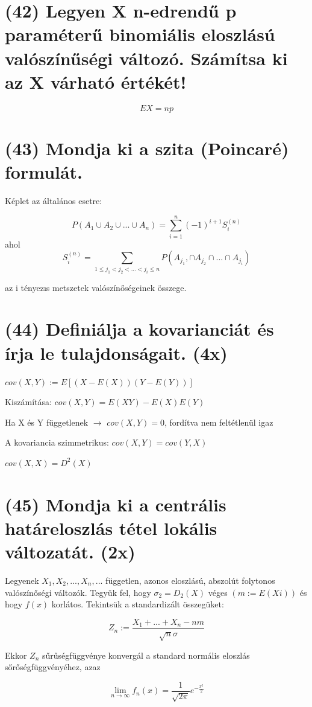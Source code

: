 \documentclass[12p]{article}
\begin{document}
\section{(42) Legyen X n-edrendű p paraméterű binomiális eloszlású valószínűségi változó. Számítsa ki az X várható értékét!}

$$EX = np$$

\section{(43) Mondja ki a szita (Poincaré) formulát.}

Képlet az általános esetre:

$$P(A_1 \cup A_2 \cup ... \cup A_n) = \sum^n_{i=1} (-1)^{i+1} S^{(n)}_i$$
ahol
$$S^{(n)}_i = \sum_{1 \leq j_1 < j_2 < ... < j_i \leq n} P(A_{j_1}, \cap A_{j_2} \cap ... \cap A_{j_i})$$

az i tényezıs metszetek
valószínőségeinek összege.

\section{(44) Definiálja a kovarianciát és írja le tulajdonságait. (4x)}

$cov(X,Y) := E[(X-E(X))(Y-E(Y))]$

Kiszámítása:
$cov(X,Y) = E(XY)-E(X)E(Y)$

Ha X és Y függetlenek $\rightarrow$ $cov(X,Y) = 0$, fordítva nem feltétlenül igaz

A kovariancia szimmetrikus: $cov(X,Y) = cov(Y,X)$

$cov(X,X) = D^2(X)$

\section{(45) Mondja ki a centrális határeloszlás tétel lokális változatát. (2x)}

Legyenek $X_1 , X_2 ,..., X_n ,...$ független, azonos eloszlású, abszolút folytonos valószínőségi változók. Tegyük fel, hogy $\sigma_2=D_2(X)$ véges $(m:=E(Xi))$ és hogy $f(x)$ korlátos. Tekintsük a standardizált összegüket:

$$Z_n := \frac{X_1 + ... + X_n - nm}{\sqrt{n}\sigma}$$

Ekkor $Z_n$ sűrűségfüggvénye konvergál a standard normális
eloszlás sőrőségfüggvényéhez, azaz

$$\lim_{n \rightarrow \infty} f_n(x) = \frac{1}{\sqrt{2\pi}} e^{- \frac{x^2}{2}}$$
\end{document}
